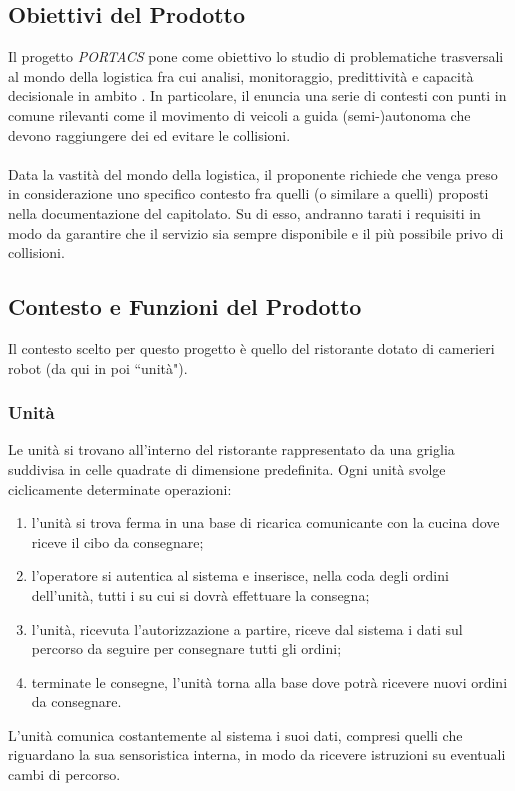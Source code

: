 \subsection{Obiettivi del Prodotto}
Il progetto \textit{PORTACS} pone come obiettivo lo studio di problematiche trasversali al mondo della logistica fra cui analisi, monitoraggio, predittività e capacità decisionale in ambito . In particolare, il  enuncia una serie di contesti con punti in comune rilevanti come il movimento di veicoli a guida (semi-)autonoma che devono raggiungere dei  ed evitare le collisioni.
\\\\
Data la vastità del mondo della logistica, il proponente richiede che venga preso in considerazione uno specifico contesto fra quelli (o similare a quelli) proposti nella documentazione del capitolato. Su di esso, andranno tarati i requisiti in modo da garantire che il servizio sia sempre disponibile e il più possibile privo di collisioni.

\subsection{Contesto e Funzioni del Prodotto}
Il contesto scelto per questo progetto è quello del ristorante dotato di camerieri robot (da qui in poi ``unità").
    \subsubsection{Unità}
    Le unità si trovano all'interno del ristorante rappresentato da una griglia suddivisa in celle quadrate di dimensione predefinita. Ogni unità svolge ciclicamente determinate operazioni:
    \begin{enumerate}
        \item l'unità si trova ferma in una base di ricarica comunicante con la cucina dove riceve il cibo da consegnare;
        \item l'operatore si autentica al sistema e inserisce, nella coda degli ordini dell'unità, tutti i  su cui si dovrà effettuare la consegna;
        \item l'unità, ricevuta l'autorizzazione a partire, riceve dal sistema i dati sul percorso da seguire per consegnare tutti gli ordini;
        \item terminate le consegne, l'unità torna alla base dove potrà ricevere nuovi ordini da consegnare.
    \end{enumerate}
    L'unità comunica costantemente al sistema i suoi dati, compresi quelli che riguardano la sua sensoristica interna, in modo da ricevere istruzioni su eventuali cambi di percorso.

